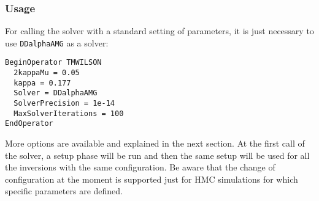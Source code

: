 \subsubsection{Usage}
For calling the solver with a standard setting of parameters, it is just necessary to use \texttt{DDalphaAMG} as a solver:
\begin{Verbatim}[fontsize=\small]
BeginOperator TMWILSON
  2kappaMu = 0.05
  kappa = 0.177
  Solver = DDalphaAMG
  SolverPrecision = 1e-14
  MaxSolverIterations = 100
EndOperator
\end{Verbatim}
More options are available and explained in the next section. At the first call of the solver, a setup phase will be run and then the same setup will be used for all the inversions with the same configuration. Be aware that the change of configuration at the moment is supported just for HMC simulations for which specific parameters are defined.
